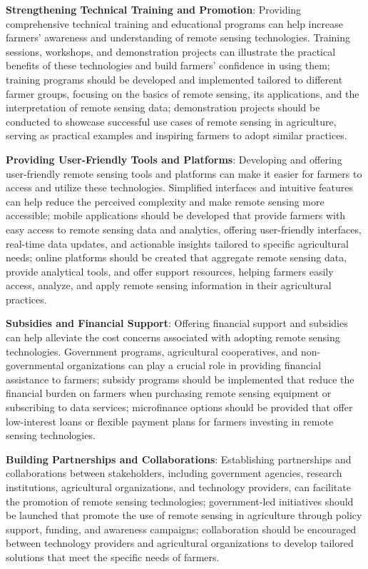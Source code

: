 \textbf{Strengthening Technical Training and Promotion}:
Providing comprehensive technical training and educational programs can help increase farmers' awareness and understanding of remote sensing technologies\cite{mullaTwentyFiveYears2013}. Training sessions, workshops, and demonstration projects can illustrate the practical benefits of these technologies and build farmers' confidence in using them; training programs should be developed and implemented tailored to different farmer groups, focusing on the basics of remote sensing, its applications, and the interpretation of remote sensing data; demonstration projects should be conducted to showcase successful use cases of remote sensing in agriculture, serving as practical examples and inspiring farmers to adopt similar practices.

\textbf{Providing User-Friendly Tools and Platforms}\cite{radocajRoleRemoteSensing2022}:
Developing and offering user-friendly remote sensing tools and platforms can make it easier for farmers to access and utilize these technologies. Simplified interfaces and intuitive features can help reduce the perceived complexity and make remote sensing more accessible; mobile applications should be developed that provide farmers with easy access to remote sensing data and analytics, offering user-friendly interfaces, real-time data updates, and actionable insights tailored to specific agricultural needs; online platforms should be created that aggregate remote sensing data, provide analytical tools, and offer support resources, helping farmers easily access, analyze, and apply remote sensing information in their agricultural practices.

\textbf{Subsidies and Financial Support}\cite{ozdoganRemoteSensingIrrigated2010}:
Offering financial support and subsidies can help alleviate the cost concerns associated with adopting remote sensing technologies. Government programs, agricultural cooperatives, and non-governmental organizations can play a crucial role in providing financial assistance to farmers; subsidy programs should be implemented that reduce the financial burden on farmers when purchasing remote sensing equipment or subscribing to data services; microfinance options should be provided that offer low-interest loans or flexible payment plans for farmers investing in remote sensing technologies.

\textbf{Building Partnerships and Collaborations}:
Establishing partnerships and collaborations between stakeholders, including government agencies, research institutions, agricultural organizations, and technology providers, can facilitate the promotion of remote sensing technologies\cite{ozdoganRemoteSensingIrrigated2010}; government-led initiatives should be launched that promote the use of remote sensing in agriculture through policy support, funding, and awareness campaigns; collaboration should be encouraged between technology providers and agricultural organizations to develop tailored solutions that meet the specific needs of farmers.

